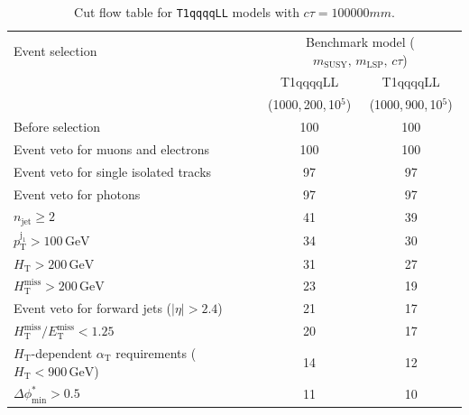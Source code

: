 \begin{table}[!h]
  \caption{Cut flow table for \texttt{T1qqqqLL} models with $c\tau = 100000\unit{mm}$.} 
  \label{tab:cut_flow_ctau_100000}
{\scriptsize%
\centering
\begin{tabular}{lcc}
  \hline
  Event selection & \multicolumn{2}{c}{Benchmark model ($m_\mathrm{SUSY},\,m_\mathrm{LSP},\,c\tau$)} \\
  \cline{2-3}
   & T1qqqqLL & T1qqqqLL \\
    & (1000,\,200,\,10$^5$) & (1000,\,900,\,10$^5$) \\
  \hline
  Before selection  & 100\phantom{.1} & 100\phantom{.1} \\
  Event veto for muons and electrons & 100\phantom{.1} & 100\phantom{.1} \\
  Event veto for single isolated tracks & \phantom{1}97\phantom{.1} & \phantom{1}97\phantom{.1} \\
  Event veto for photons & \phantom{1}97\phantom{.1} & \phantom{1}97\phantom{.1} \\
   $n_{\mathrm{jet}} \geq 2$  & \phantom{1}41\phantom{.1} & \phantom{1}39\phantom{.1} \\
   $p_{\mathrm{T}}^{\mathrm{j_1}} > 100\,\mathrm{GeV}$ & \phantom{1}34\phantom{.1} & \phantom{1}30\phantom{.1} \\
   $H_{\mathrm{T}} > 200\,\mathrm{GeV}$  & \phantom{1}31\phantom{.1} & \phantom{1}27\phantom{.1} \\
  $H_{\mathrm{T}}^{\mathrm{miss}} > 200\,\mathrm{GeV}$  & \phantom{1}23\phantom{.1} & \phantom{1}19\phantom{.1} \\
  Event veto for forward jets ($|\eta| > 2.4$) & \phantom{1}21\phantom{.1} & \phantom{1}17\phantom{.1} \\
  $H_{\mathrm{T}}^{\mathrm{miss}} / E_{\mathrm{T}}^{\mathrm{miss}} < 1.25$ & \phantom{1}20\phantom{.1} & \phantom{1}17\phantom{.1} \\
  $H_{\mathrm{T}}$-dependent $\alpha_{\mathrm{T}}$ requirements ($H_{\mathrm{T}} < 900\,\mathrm{GeV}$)  &  \phantom{1}14 \phantom{.1} & \phantom{1}12\phantom{.1} \\
  $\Delta\phi^{*}_{\mathrm{min}} > 0.5$  &  \phantom{1}11\phantom{.1} & \phantom{1}10\phantom{.1} \\
  \hline
\end{tabular}
}
\end{table}

